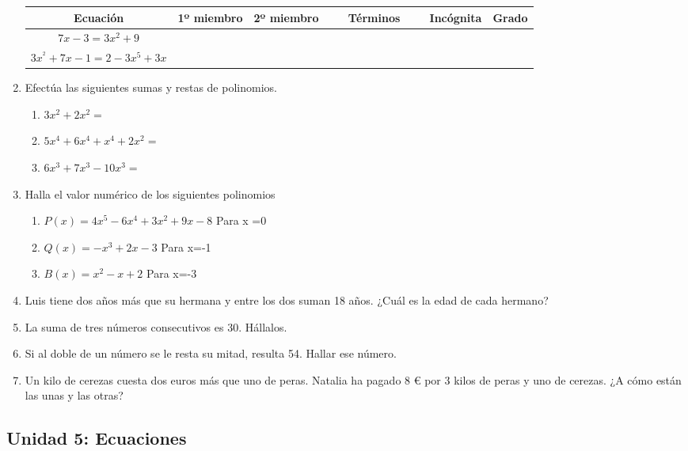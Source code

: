 \documentclass[a4paper,12pt]{article}
\begin{document}
\begin{enumerate}
        \begin{tabular}{| c | c | c | c | c | c |}
                \hline
                Ecuación & 1º miembro & 2º miembro & Términos & Incógnita & Grado \\
                \hline
                $7x-3 = 3x^2 +9$ &&& $\qquad \qquad \qquad \qquad $ &&\\ \hline
                $3x^^2+7x-1 = 2-3x^5+3x$ &&& $\qquad \qquad \qquad \qquad $ &&\\ 
                \hline
            \end{tabular}
           
        \item Efectúa las siguientes sumas y restas de polinomios. 
            \begin{enumerate}
                \item $3 x^2 + 2 x^2 =$
                \item $5x^4+6x^4+x^4+2x^2=$
                \item $6x^3+7x^3-10x^3=$
            \end{enumerate}

        \item Halla el valor numérico de los siguientes polinomios
        \begin{enumerate}
            \item $P(x) = 4x^5-6x^4+3x^2+9x-8$ Para x =0
            \item $Q(x) = -x^3+2x-3 $ Para x=-1
            \item $B(x) = x^2-x+2$ Para x=-3
        \end{enumerate}
        \item  Luis tiene dos años más que su hermana y entre los dos suman 18 años. ¿Cuál es la edad de cada hermano? 
        \item  La suma de tres números consecutivos es 30. Hállalos. 
        \item Si al doble de un número se le resta su mitad, resulta 54. Hallar ese número.
        \item Un kilo de cerezas cuesta dos euros más que uno de peras. Natalia ha pagado 8 € por 3 kilos de peras y uno de cerezas. ¿A cómo están las unas y las otras?
    \end{enumerate}

\subsection*{Unidad 5: Ecuaciones}
\end{document}
